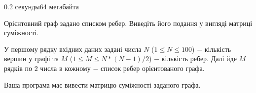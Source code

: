\begin{problem}{}{}{}{0.2 секунды}{64 мегабайта}

Орієнтовний граф задано списком ребер. Виведіть його подання у вигляді матриці суміжності.

\InputFile
У першому рядку вхідних даних задані числа $N$ ($1 \le N \le 100$) $-$ кількість вершин у графі та 
$M$ ($1 \le M \le N*(N-1)/2$) $-$ кількість ребер.
Далі йде $M$ рядків по $2$ числа в кожному $-$ список ребер орієнтованого графа. 

\OutputFile
Ваша програма має вивести матрицю суміжності заданого графа.

\Example

\begin{example}
%
\end{example}

\end{problem}

